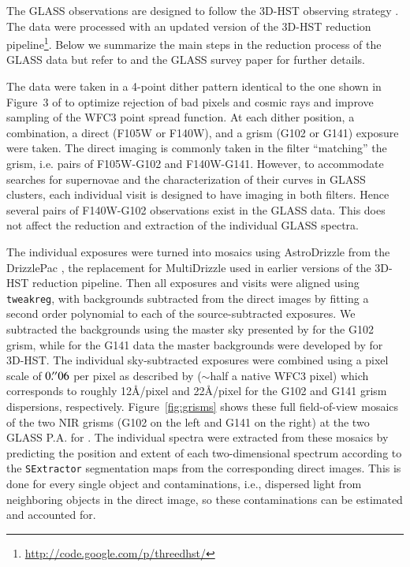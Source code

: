 
The GLASS observations are designed to follow the 3D-HST observing strategy \citep{Brammer:2012p12977}.
The data were processed with an updated version of the 3D-HST reduction pipeline\footnote{\url{http://code.google.com/p/threedhst/}}.  Below we summarize the main steps in the reduction process of the GLASS data but refer to 
\cite{Brammer:2012p12977} and the GLASS survey paper \citep{Treu:2015p36793} for further details.

The data were taken in a 4-point dither pattern identical to the one
shown in Figure~3 of \cite{Brammer:2012p12977} to optimize rejection of bad pixels and cosmic rays
and improve sampling of the WFC3 point spread function.
At each dither position, a combination, a direct (F105W or F140W), and a grism (G102 or G141) exposure were taken.
The direct imaging is commonly taken in the filter ``matching'' the grism, i.e. pairs of F105W-G102 and F140W-G141.  However, to 
accommodate searches for supernovae and the characterization of their curves in GLASS clusters, each individual visit is designed 
to have imaging in both filters. Hence several pairs of F140W-G102 observations exist in the GLASS data. This does not affect the 
reduction and extraction of the individual GLASS spectra.

The individual exposures were turned into mosaics using AstroDrizzle from the DrizzlePac \citep{Gonzaga:2014p26307}, the  
replacement for MultiDrizzle \citep{Koekemoer:2003p31861} used in earlier versions of the 3D-HST reduction pipeline. Then all  
exposures and visits were aligned using \verb+tweakreg+, with backgrounds subtracted from the direct images by fitting a second  
order polynomial to each of the source-subtracted exposures. We subtracted the backgrounds using the master sky presented by  
\cite{Kummel:2011p33451} for the G102 grism, while for the G141 data the master backgrounds were developed by  
\cite{Brammer:2012p12977} for 3D-HST. The individual sky-subtracted exposures were combined using a pixel scale of $0\mbox{$.\!^{\prime\prime}$}06$ per  
pixel as described by \citet{Brammer:2013p27911} ($\sim$half a native WFC3 pixel) which corresponds to roughly 12\AA/pixel and  
22\AA/pixel for the G102 and G141 grism dispersions, respectively. Figure~\ref{fig:grisms} shows these full field-of-view 
mosaics of the two NIR grisms (G102 on the left and G141 on the right) at the two GLASS P.A. for \cler. The  individual spectra 
were extracted from these mosaics by predicting the position and extent of each two-dimensional spectrum according to the 
\verb+SExtractor+ \citep{Bertin:1996p12964} segmentation maps from the corresponding direct images. This is done for every single 
object and contaminations, i.e., dispersed light from neighboring objects in the direct image, so these contaminations can be 
estimated and accounted for.

